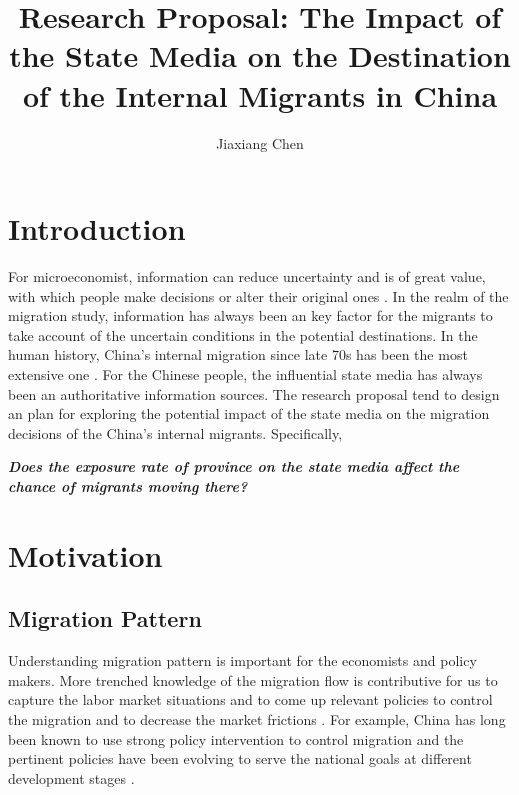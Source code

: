 \documentclass{article}
\title{\textbf{Research Proposal: The Impact of the State Media on the Destination of the Internal Migrants in China}}
\author{Jiaxiang Chen}
\date{}
\begin{document}
\maketitle
\linespread{1.2}

\section{Introduction}
For microeconomist, information can reduce uncertainty and is of great value, with which people make decisions or alter their original ones \parencite{Feltham:1968vm}. In the realm of the migration study, information has always been an key factor for the migrants to take account of the uncertain conditions in the potential destinations. In the human history, China's internal migration since late 70s has been the most extensive one \parencite{ILO:2013lm}. For the Chinese people, the influential state media has always been an authoritative information sources. The research proposal tend to design an plan for exploring the potential impact of the state media on the migration decisions of the China's internal migrants. Specifically,
\begin{center}
   \textbf{\textit{Does the exposure rate of province on the state media affect the chance of migrants moving there?}} 
\end{center}

\section{Motivation}

\subsection{Migration Pattern}
Understanding migration pattern is important for the economists and policy makers. More trenched knowledge of the migration flow is contributive for us to capture the labor market situations and to come up relevant policies to control the migration and to decrease the market frictions \parencite{Castles:2004cf}. For example, China has long been known to use strong policy intervention to control migration and the pertinent policies have been evolving to serve the national goals at  different development stages \parencite{Cai:2009qr}.
\end{document}
